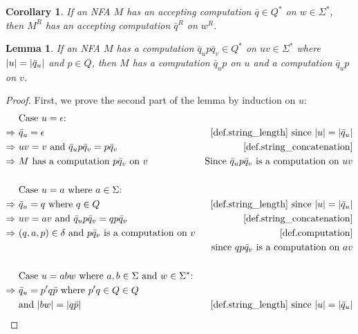 \documentclass{report}
\DeclarePairedDelimiter{\abs}{\lvert}{\rvert}
\newtheorem{lemma}[theorem]{Lemma}
\newtheorem{corollary}[theorem]{Corollary}
\theoremstyle{definition}
\begin{document}
\begin{appendices}
\begin{corollary} \label{crl.reverse_accepting_computation}
If an NFA $M$ has an accepting computation $\bar{q} \in Q^{\ast}$ on
$w \in \Sigma^{\ast}$, then $M^R$ has an accepting computation $\bar{q}^R$ on $w^R$.
\end{corollary}

\begin{lemma} \label{lma.computation_split}
If an NFA $M$ has a computation $\bar{q}_u p \bar{q}_v \in Q^{\ast}$ on
$uv \in \Sigma^{\ast}$ where $\abs{u} = \abs{\bar{q}_u}$ and $p \in Q$, then $M$
has a computation $\bar{q}_u p$ on $u$ and a computation $\bar{q}_u p$ on $v$.
\end{lemma}

\begin{proof}
First, we prove the second part of the lemma by induction on $u$:
\begin{align*}
& \text{Case } u = \epsilon \text{:} \\
\Rightarrow \ & \bar{q}_u = \epsilon
& \text{\cref{def.string_length} since } \abs{u} = \abs{\bar{q}_u} \\
\Rightarrow \ & uv = v \text{ and } \bar{q}_u p \bar{q}_v = p \bar{q}_v
& \text{\cref{def.string_concatenation}} \\
\Rightarrow \ & M \text{ has a computation } p \bar{q}_v \text{ on } v
& \text{Since } \bar{q}_u p \bar{q}_v \text{ is a computation on } uv \\
\\
& \text{Case } u = a \text{ where } a \in \Sigma \text{:} \\
\Rightarrow \ & \bar{q}_u = q \text{ where } q \in Q
& \text{\cref{def.string_length} since } \abs{u} = \abs{\bar{q}_u} \\
\Rightarrow \ & uv = av \text{ and } \bar{q}_u p \bar{q}_v = qp \bar{q}_v
& \text{\cref{def.string_concatenation}} \\
\Rightarrow \ & (q, a, p) \in \delta \text{ and }
p \bar{q}_v \text{ is a computation on } v
& \text{\cref{def.computation}} \\
& & \text{since } qp \bar{q}_v \text{ is a computation on } av \\
\\
& \text{Case } u = abw \text{ where } a, b \in \Sigma \text{ and } w \in
\Sigma^{\ast} \text{:} \\
\Rightarrow \ & \bar{q}_u = p'q \bar{p} \text{ where } p'q \in Q \in Q \\
& \text{and } \abs{bw} = \abs{q \bar{p}}
& \text{\cref{def.string_length} since } \abs{u} = \abs{\bar{q}_u} \\

\end{align*}
\end{proof}
\end{appendices}
\end{document}
